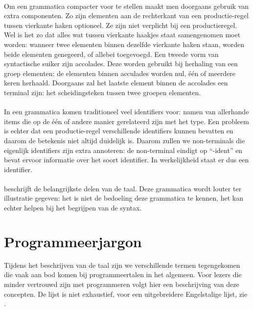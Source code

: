 \paragraph{}
Om een grammatica compacter voor te stellen maakt men doorgaans gebruik van extra componenten. Zo zijn elementen aan de rechterkant van een productie-regel tussen vierkante haken optioneel. Ze zijn niet verplicht bij een productieregel. Wel is het zo dat alles wat tussen vierkante haakjes staat samengenomen moet worden: wanneer twee elementen binnen dezelfde vierkante haken staan, worden beide elementen genegeerd, of allebei toegevoegd. Een tweede vorm van syntactische suiker zijn accolades. Deze worden gebruikt bij herhaling van een groep elementen: de elementen binnen acculades worden nul, \'e\'en of meerdere keren herhaald. Doorgaans zal het laatste element binnen de accolades een terminal zijn: het scheidingsteken tussen twee groepen elementen.

\paragraph{}
In een grammatica komen traditioneel veel identifiers voor: namen van allerhande items die op de \'e\'en of andere manier gerelateerd zijn met het type. Een probleem is echter dat een productie-regel verschillende identifiers kunnen bevatten en daarom de betekenis niet altijd duidelijk is. Daarom zullen we non-terminals die eigenlijk identifiers zijn extra annoteren: de non-terminal eindigt op ``-ident'' en bevat ervoor informatie over het soort identifier. In werkelijkheid staat er dus een identifier.

\paragraph{}
 beschrijft de belangrijkste delen van de \tvhdl{} taal. Deze grammatica wordt louter ter illustratie gegeven: het is niet de bedoeling deze grammatica te kennen, het kan echter helpen bij het begrijpen van de \tvhdl{} syntax.

% 
\section{Programmeerjargon}
Tijdens het beschrijven van de \tvhdl{} taal zijn we verschillende termen tegengekomen die vaak aan bod komen bij programmeertalen in het algemeen. Voor lezers die minder vertrouwd zijn met programmeren volgt hier een beschrijving van deze concepten. De lijst is niet exhaustief, voor een uitgebreidere Engelstalige lijst, zie \cite{vanonsemglossary}.

